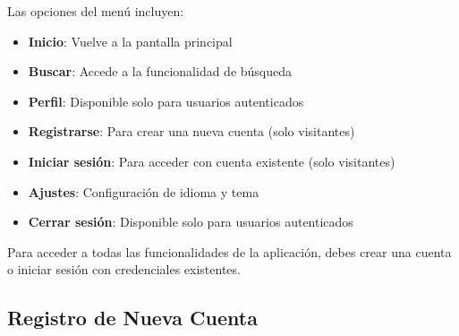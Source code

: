 \documentclass[a4paper,10pt]{report}
\begin{document}
      Las opciones del menú incluyen:
      \begin{itemize}
        \item \textbf{Inicio}: Vuelve a la pantalla principal
        \item \textbf{Buscar}: Accede a la funcionalidad de búsqueda
        \item \textbf{Perfil}: Disponible solo para usuarios autenticados
        \item \textbf{Registrarse}: Para crear una nueva cuenta (solo visitantes)
        \item \textbf{Iniciar sesión}: Para acceder con cuenta existente (solo visitantes)
        \item \textbf{Ajustes}: Configuración de idioma y tema
        \item \textbf{Cerrar sesión}: Disponible solo para usuarios autenticados
      \end{itemize}   
    
    Para acceder a todas las funcionalidades de la aplicación, debes crear una cuenta o iniciar sesión con credenciales existentes.
    
    \subsection{Registro de Nueva Cuenta}
    
\end{document}
